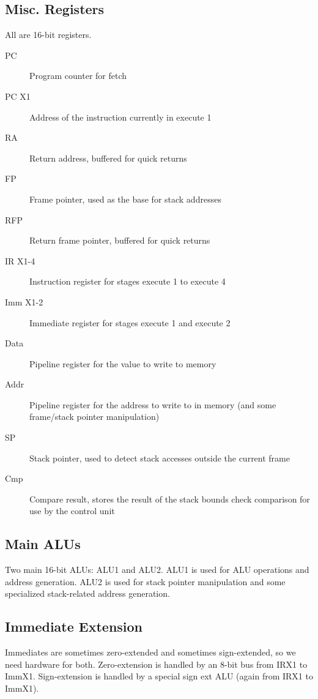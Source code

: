 \documentclass{report}
\begin{document}
		\subsection{Misc. Registers}

			All are 16-bit registers.

			\begin{description}
				\item[PC] Program counter for fetch
				\item[PC X1] Address of the instruction currently in execute 1
				\item[RA] Return address, buffered for quick returns
				\item[FP] Frame pointer, used as the base for stack addresses
				\item[RFP] Return frame pointer, buffered for quick returns
				\item[IR X1-4] Instruction register for stages execute 1 to execute 4
				\item[Imm X1-2] Immediate register for stages execute 1 and execute 2
				\item[Data] Pipeline register for the value to write to memory
				\item[Addr] Pipeline register for the address to write to in memory (and some frame/stack pointer manipulation)
				\item[SP] Stack pointer, used to detect stack accesses outside the current frame
				\item[Cmp] Compare result, stores the result of the stack bounds check comparison for use by the control unit
			\end{description}

		\subsection{Main ALUs}

			Two main 16-bit ALUs: ALU1 and ALU2.
			ALU1 is used for ALU operations and address generation.
			ALU2 is used for stack pointer manipulation and some specialized stack-related address generation.

		\subsection{Immediate Extension}

			Immediates are sometimes zero-extended and sometimes sign-extended, so we need hardware for both.
			Zero-extension is handled by an 8-bit bus from IRX1 to ImmX1.
			Sign-extension is handled by a special sign ext ALU (again from IRX1 to ImmX1).
\end{document}
